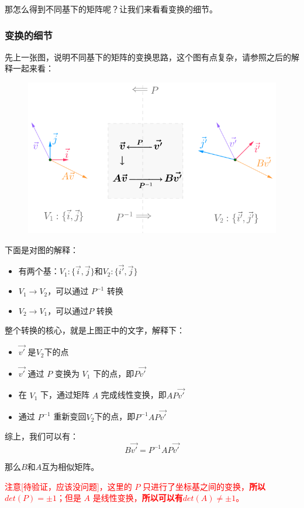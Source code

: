\documentclass[12pt]{article}
\begin{document}
那怎么得到不同基下的矩阵呢？让我们来看看变换的细节。

\subsubsection{变换的细节}
先上一张图，说明不同基下的矩阵的变换思路，这个图有点复杂，请参照之后的解释一起来看：
\begin{figure}[H]
    \centering
    \includegraphics[width=.8\textwidth]{fig/UnderstandSimilarMatrix_3.png}
\end{figure} 

下面是对图的解释：
\begin{itemize}
    \item 有两个基：$V_1:\{\vec{i},\vec{j}\}$和$V_2:\{\vec{i'}, \vec{j}\}$
    \item $V_1 \rightarrow V_2$，可以通过 $P^{-1}$ 转换
    \item $V_2 \rightarrow V_1$，可以通过$P$ 转换
\end{itemize}

整个转换的核心，就是上图正中的文字，解释下：
\begin{itemize}
    \item $\vec{v'}$ 是$V_2$下的点
    \item $\vec{v'}$ 通过 $P$ 变换为 $V_1$ 下的点，即$P\vec{v'}$
    \item 在 $V_1$ 下，通过矩阵 $A$ 完成线性变换，即$AP\vec{v'}$
    \item 通过 $P^{-1}$ 重新变回$V_2$下的点，即$P^{-1}AP\vec{v'}$
\end{itemize}

综上，我们可以有：
$$
B\vec{v'} = P^{-1}AP\vec{v'}
$$

那么$B$和$A$互为相似矩阵。

\textcolor{red}{注意[待验证，应该没问题]，这里的 $P$ 只进行了坐标基之间的变换，\textbf{所以$det(P) = \pm 1$}；但是 $A$ 是线性变换，\textbf{所以可以有$det(A) \ne \pm 1$}。}
\end{document}
